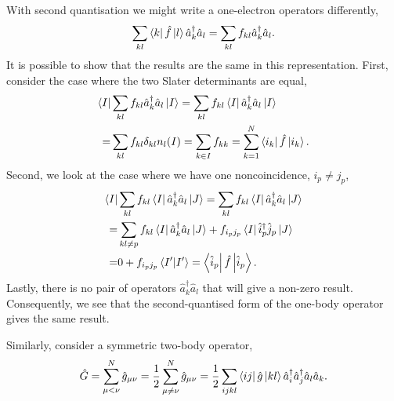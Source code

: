 With second quantisation we might write a one-electron operators differently,
\begin{equation}
    \sum_{kl} \bra{k} \hat{f} \ket{l} \hat{a}^\dagger_k \hat{a}_l
    = \sum_{kl} f_{kl} \hat{a}^\dagger_k \hat{a}_l.
\end{equation}
It is possible to show that the results are the same in this representation. First,
consider the case where the two Slater determinants are equal,
\begin{equation}
    \begin{aligned}
        \bra{I}& \sum_{kl} f_{kl} \hat{a}^\dagger_k \hat{a}_l \ket{I}
        = \sum_{kl} f_{kl} \bra{I} \hat{a}^\dagger_k \hat{a}_l \ket{I} \\
        =& \sum_{kl} f_{kl} \delta_{kl} n_l(I) = \sum_{k \in I} f_{kk}
        = \sum_{k=1}^N \bra{i_k} \hat{f} \ket{i_k}.
    \end{aligned}
\end{equation}
Second, we look at the case where we have one noncoincidence, $i_p \neq j_p$,
\begin{equation}
    \begin{aligned}
        \bra{I}& \sum_{kl}f_{kl} \bra{I} \hat{a}^\dagger_k \hat{a}_l \ket{J}
        = \sum_{kl} f_{kl} \bra{I} \hat{a}^\dagger_k \hat{a}_l\ket{J} \\
        =& \sum_{kl \neq p} f_{kl} \bra{I} \hat{a}^\dagger_k \hat{a}_l \ket{J}
        + f_{i_p j_p} \bra{I} \hat{i}^\dagger_p \hat{j}_p \ket{J} \\
        =& 0 + f_{i_p j_p} \braket{I'} = \bra{\hat{i}_p}\hat{f}\ket{\hat{i}_p}.
    \end{aligned}
\end{equation}
Lastly, there is no pair of operators $\hat{a}^\dagger_k \hat{a}_l$ that will give
a non-zero result. Consequently, we see that the second-quantised form of the
one-body operator gives the same result.

Similarly, consider a symmetric two-body operator,
\begin{equation}
    \hat{G} = \sum_{\mu < \nu}^N \hat{g}_{\mu\nu} 
        = \frac{1}{2} \sum_{\mu \neq \nu}^N \hat{g}_{\mu\nu} \\
        = \frac{1}{2} \sum_{ijkl} \bra{ij} \hat{g} \ket{kl} 
        \hat{a}^\dagger_i \hat{a}^\dagger_j \hat{a}_l \hat{a}_k.
\end{equation}

